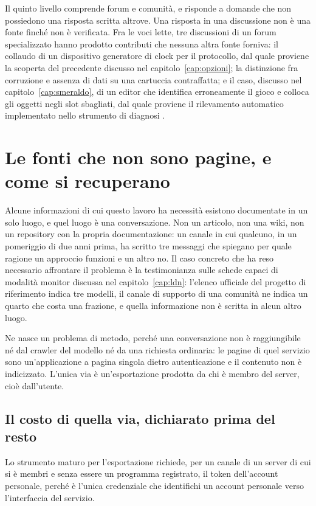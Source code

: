 Il quinto livello comprende forum e comunità, e risponde a domande che non possiedono una risposta scritta altrove. Una risposta in una discussione non è una fonte finché non è verificata. Fra le voci lette, tre discussioni di un forum specializzato hanno prodotto contributi che nessuna altra fonte forniva: il collaudo di un dispositivo generatore di clock per il protocollo, dal quale proviene la scoperta del precedente discusso nel capitolo~\ref{cap:opzioni}; la distinzione fra corruzione e assenza di dati su una cartuccia contraffatta; e il caso, discusso nel capitolo~\ref{cap:smeraldo}, di un editor che identifica erroneamente il gioco e colloca gli oggetti negli slot sbagliati, dal quale proviene il rilevamento automatico implementato nello strumento di diagnosi \cite{projectpokemon}.

\section{Le fonti che non sono pagine, e come si recuperano}

Alcune informazioni di cui questo lavoro ha necessità esistono documentate in un solo luogo, e quel luogo è una conversazione. Non un articolo, non una wiki, non un repository con la propria documentazione: un canale in cui qualcuno, in un pomeriggio di due anni prima, ha scritto tre messaggi che spiegano per quale ragione un approccio funzioni e un altro no. Il caso concreto che ha reso necessario affrontare il problema è la testimonianza sulle schede capaci di modalità monitor discussa nel capitolo~\ref{cap:ldn}: l'elenco ufficiale del progetto di riferimento indica tre modelli, il canale di supporto di una comunità ne indica un quarto che costa una frazione, e quella informazione non è scritta in alcun altro luogo.

Ne nasce un problema di metodo, perché una conversazione non è raggiungibile né dal crawler del modello né da una richiesta ordinaria: le pagine di quel servizio sono un'applicazione a pagina singola dietro autenticazione e il contenuto non è indicizzato. L'unica via è un'esportazione prodotta da chi è membro del server, cioè dall'utente.

\subsection{Il costo di quella via, dichiarato prima del resto}

Lo strumento maturo per l'esportazione richiede, per un canale di un server di cui si è membri e senza essere un programma registrato, il token dell'account personale, perché è l'unica credenziale che identifichi un account personale verso l'interfaccia del servizio.


